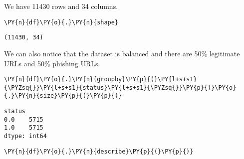  We have 11430 rows and 34 columns.

    \begin{tcolorbox}[breakable, size=fbox, boxrule=1pt, pad at break*=1mm,colback=cellbackground, colframe=cellborder]
\begin{Verbatim}[commandchars=\\\{\}]
\PY{n}{df}\PY{o}{.}\PY{n}{shape}
\end{Verbatim}
\end{tcolorbox}

            \begin{tcolorbox}[breakable, size=fbox, boxrule=.5pt, pad at break*=1mm, opacityfill=0]
\begin{Verbatim}[commandchars=\\\{\}]
(11430, 34)
\end{Verbatim}
\end{tcolorbox}
        
    We can also notice that the dataset is balanced and there are 50\%
legitimate URLs and 50\% phishing URLs.

    \begin{tcolorbox}[breakable, size=fbox, boxrule=1pt, pad at break*=1mm,colback=cellbackground, colframe=cellborder]
\begin{Verbatim}[commandchars=\\\{\}]
\PY{n}{df}\PY{o}{.}\PY{n}{groupby}\PY{p}{(}\PY{l+s+s1}{\PYZsq{}}\PY{l+s+s1}{status}\PY{l+s+s1}{\PYZsq{}}\PY{p}{)}\PY{o}{.}\PY{n}{size}\PY{p}{(}\PY{p}{)}
\end{Verbatim}
\end{tcolorbox}

            \begin{tcolorbox}[breakable, size=fbox, boxrule=.5pt, pad at break*=1mm, opacityfill=0]
\begin{Verbatim}[commandchars=\\\{\}]
status
0.0    5715
1.0    5715
dtype: int64
\end{Verbatim}
\end{tcolorbox}
        
    
    \begin{tcolorbox}[breakable, size=fbox, boxrule=1pt, pad at break*=1mm,colback=cellbackground, colframe=cellborder]
\begin{Verbatim}[commandchars=\\\{\}]
\PY{n}{df}\PY{o}{.}\PY{n}{describe}\PY{p}{(}\PY{p}{)}
\end{Verbatim}
\end{tcolorbox}


